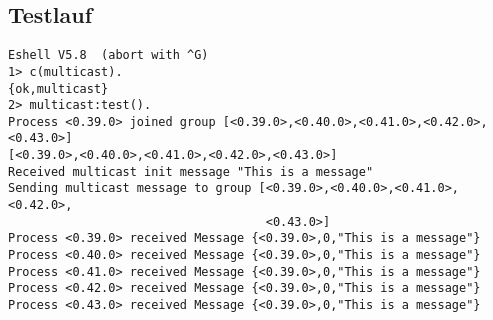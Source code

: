 \documentclass[a4paper,9pt]{article}
\begin{document}
\subsection{Testlauf}

\begin{verbatim}
Eshell V5.8  (abort with ^G)
1> c(multicast).
{ok,multicast}
2> multicast:test().
Process <0.39.0> joined group [<0.39.0>,<0.40.0>,<0.41.0>,<0.42.0>,<0.43.0>]
[<0.39.0>,<0.40.0>,<0.41.0>,<0.42.0>,<0.43.0>]
Received multicast init message "This is a message"
Sending multicast message to group [<0.39.0>,<0.40.0>,<0.41.0>,<0.42.0>,
                                    <0.43.0>]
Process <0.39.0> received Message {<0.39.0>,0,"This is a message"}
Process <0.40.0> received Message {<0.39.0>,0,"This is a message"}
Process <0.41.0> received Message {<0.39.0>,0,"This is a message"}
Process <0.42.0> received Message {<0.39.0>,0,"This is a message"}
Process <0.43.0> received Message {<0.39.0>,0,"This is a message"}
\end{verbatim}
\end{document}
